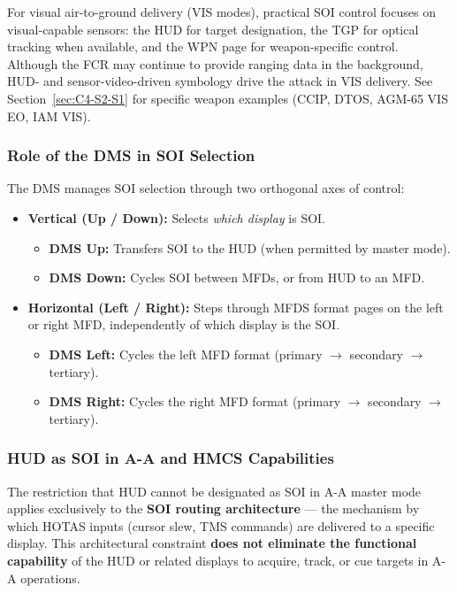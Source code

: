 \documentclass[11pt,a4paper]{article}
\begin{document}
For visual air-to-ground delivery (VIS modes), practical SOI control focuses on visual-capable sensors: the HUD for target designation, the TGP for optical tracking when available, and the WPN page for weapon-specific control. Although the FCR may continue to provide ranging data in the background, HUD- and sensor-video-driven symbology drive the attack in VIS delivery. See Section~\ref{sec:C4-S2-S1} for specific weapon examples (CCIP, DTOS, AGM-65 VIS EO, IAM VIS).

\subsubsection{Role of the DMS in SOI Selection}
\label{sec:C4-S1-S2}

The DMS manages SOI selection through two orthogonal axes of control:

\begin{itemize}
    \item \textbf{Vertical (Up / Down):} Selects \textit{which display} is SOI.
        \begin{itemize}
            \item \textbf{DMS Up:} Transfers SOI to the HUD (when permitted by master mode).
            \item \textbf{DMS Down:} Cycles SOI between MFDs, or from HUD to an MFD.
        \end{itemize}
    \item \textbf{Horizontal (Left / Right):} Steps through MFDS format pages on the left or right MFD, independently of which display is the SOI.
        \begin{itemize}
            \item \textbf{DMS Left:} Cycles the left MFD format (primary $\to$ secondary $\to$ tertiary).
            \item \textbf{DMS Right:} Cycles the right MFD format (primary $\to$ secondary $\to$ tertiary).
        \end{itemize}
\end{itemize}

\subsubsection{HUD as SOI in A-A and HMCS Capabilities}
\label{sec:C4-S1-S3}

The restriction that HUD cannot be designated as SOI in A-A master mode applies exclusively to the \textbf{SOI routing architecture} — the mechanism by which HOTAS inputs (cursor slew, TMS commands) are delivered to a specific display. This architectural constraint \textbf{does not eliminate the functional capability} of the HUD or related displays to acquire, track, or cue targets in A-A operations.
\end{document}

